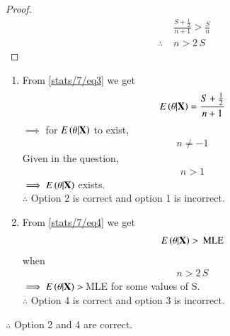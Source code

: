     \begin{proof}
    \begin{align}
        &\frac{S+\frac{1}{2}}{n+1} > \frac{S}{n}\nonumber\\
         \therefore\;&n>2\,S
    \end{align}
    \end{proof}
    \begin{enumerate}
        \item From \eqref{stats/7/eq3} we get 
            \begin{align*}
            E\left(\theta|\mathbf{X}\right) = \frac{S+\frac{1}{2}}{n+1} 
            \end{align*}
            $\implies$ for $ E\left(\theta|\mathbf{X}\right)$ to exist, 
            \begin{align*}
                n\neq-1
            \end{align*}
            Given in the question,
            \begin{align*}
                n>1
            \end{align*}
             $\implies E\left(\theta|\mathbf{X}\right)$ exists.\\
             $\therefore$ Option 2 is correct and option 1 is incorrect.
        \item From \eqref{stats/7/eq4} we get 
            \begin{align*}
                E\left(\theta|\mathbf{X}\right)>\, \text{MLE}\\
            \end{align*}
            when
            \begin{align*}
                n>2\,S
            \end{align*}
            $\implies E\left(\theta|\mathbf{X}\right)>\, $MLE for some values of S.\\
            $\therefore$ Option 4 is correct and option 3 is incorrect.
    \end{enumerate}
    $\therefore$ Option 2 and 4 are correct.